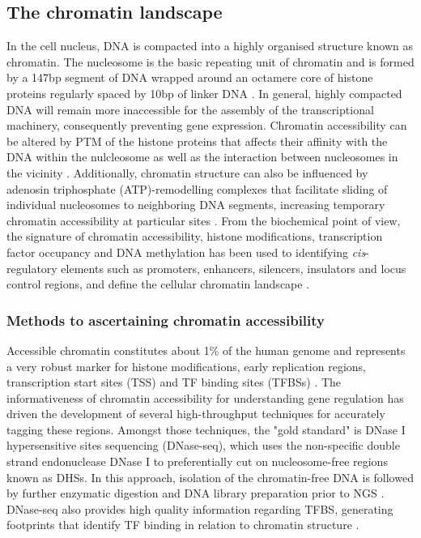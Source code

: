 \subsection{The chromatin landscape}
In the cell nucleus, DNA is compacted into a highly organised structure known as chromatin. The nucleosome is the basic repeating unit of chromatin and is formed by a 147bp segment of DNA wrapped around an octamere core of histone proteins regularly spaced by 10bp of linker DNA \parencite{Luger1997}. In general, highly compacted DNA will remain more inaccessible for the assembly of the transcriptional machinery, consequently preventing gene expression. Chromatin accessibility can be altered by PTM of the histone proteins that affects their affinity with the DNA within the nulcleosome as well as the interaction between nucleosomes in the vicinity \parencite{Polach2000,Pepenella2014}. Additionally, chromatin structure can also be influenced by adenosin triphosphate (ATP)-remodelling complexes that facilitate sliding of individual nucleosomes to neighboring DNA segments, increasing temporary chromatin accessibility at particular sites \parencite{Cosma1999}. From the biochemical point of view, the signature of chromatin accessibility, histone modifications, transcription factor occupancy and DNA methylation has been used to identifying \textit{cis}-regulatory elements such as promoters, enhancers, silencers, insulators and locus control regions, and define the cellular chromatin landscape \parencite{Boyle2012,Kundaje2015}.



\subsubsection{Methods to ascertaining chromatin accessibility}

Accessible chromatin constitutes about 1\% of the human genome and represents a very robust marker for histone modifications, early replication regions, transcription start sites (TSS) and TF binding sites (TFBSs) \parencite{ENCODE2007}. The informativeness of chromatin accessibility for understanding gene regulation has driven the development of several high-throughput techniques for accurately tagging these regions. Amongst those techniques, the "gold standard" is DNase I hypersensitive sites sequencing (DNase-seq), which uses the non-specific double strand endonuclease DNase I to preferentially cut on nucleosome-free regions known as DHSs. In this approach, isolation of the chromatin-free DNA is followed by further enzymatic digestion and DNA library preparation prior to NGS \parencite{John2013}. DNase-seq also provides high quality information regarding TFBS, generating footprints that identify TF binding in relation to chromatin structure \parencite{Hesselberth2009,Boyle2010}. 

